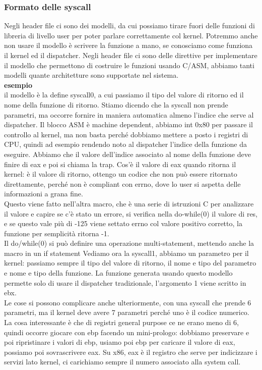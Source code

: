 \documentclass[12pt, oneside]{extbook}
\begin{document}
\subsubsection{Formato delle syscall}
Negli header file ci sono dei modelli, da cui possiamo tirare fuori delle funzioni di libreria di livello user per poter parlare correttamente col kernel. Potremmo anche non usare il modello è scrivere la funzione a mano, se conosciamo come funziona il kernel ed il dispatcher. Negli header file ci sono delle direttive per implementare il modello che permettono di costruire le funzioni usando C/ASM, abbiamo tanti modelli quante architetture sono supportate nel sistema.\\
\textbf{esempio}\\ il modello è la define syscall0, a cui passiamo il tipo del valore di ritorno ed il nome della funzione di ritorno. Stiamo dicendo che la syscall non prende parametri, ma occorre fornire in maniera automatica almeno l'indice che serve al dispatcher. Il blocco ASM è machine dependent, abbiamo \textsf{int 0x80} per passare il controllo al kernel, ma non basta perché dobbiamo mettere a posto i registri di CPU, quindi ad esempio rendendo noto al dispatcher l'indice della funzione da eseguire. Abbiamo che il valore dell'indice associato al nome della funzione deve finire di eax e poi si chiama la trap. Cos'è il valore di eax quando ritorna il kernel: è il valore di ritorno, ottengo un codice che non può essere ritornato direttamente, perché non è compliant con errno, dove lo user si aspetta delle informazioni a grana fine.\\ Questo viene fatto nell'altra macro, che è una serie di istruzioni C per analizzare il valore e capire se c'è stato un errore, si verifica nella do-while(0) il valore di res, e se questo vale più di -125 viene settato errno col valore positivo corretto, la funzione per semplicità ritorna -1.\\ Il do/while(0) si può definire una operazione multi-statement, mettendo anche la macro in un if statement
Vediamo ora la syscall1, abbiamo un parametro per il kernel: passiamo sempre il tipo del valore di ritorno, il nome e tipo del parametro e nome e tipo della funzione.
La funzione generata usando questo modello permette solo di usare il dispatcher tradizionale, l'argomento 1 viene scritto in ebx.\\ Le cose si possono complicare anche ulteriormente, con una syscall che prende 6 parametri, ma il kernel deve avere 7 parametri perché uno è il codice numerico. 
La cosa interessante è che di registri general purpose ce ne erano meno di 6, quindi occorre giocare con ebp facendo un mini-prologo: dobbiamo preservare e poi ripristinare i valori di ebp, usiamo poi ebp per caricare il valore di eax, possiamo poi sovrascrivere eax. Su x86, eax è il registro che serve per indicizzare i servizi lato kernel, ci carichiamo sempre il numero associato alla system call.
\end{document}
